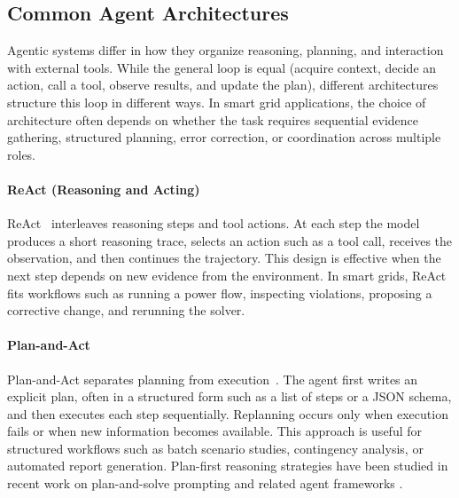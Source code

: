 \documentclass[journal,onecolumn]{IEEEtran} %
\begin{document}
\subsection{Common Agent Architectures}
Agentic systems differ in how they organize reasoning, planning, and interaction with external tools. While the general loop is equal (acquire context, decide an action, call a tool, observe results, and update the plan), different architectures structure this loop in different ways. In smart grid applications, the choice of architecture often depends on whether the task requires sequential evidence gathering, structured planning, error correction, or coordination across multiple roles.





\paragraph{ReAct (Reasoning and Acting)}
ReAct~\cite{yao2023react} interleaves reasoning steps and tool actions. At each step the model produces a short reasoning trace, selects an action such as a tool call, receives the observation, and then continues the trajectory. This design is effective when the next step depends on new evidence from the environment. In smart grids, ReAct fits workflows such as running a power flow, inspecting violations, proposing a corrective change, and rerunning the solver.

\paragraph{Plan-and-Act}
Plan-and-Act separates planning from execution~\cite{erdogan2025planact}. The agent first writes an explicit plan, often in a structured form such as a list of steps or a JSON schema, and then executes each step sequentially. Replanning occurs only when execution fails or when new information becomes available. This approach is useful for structured workflows such as batch scenario studies, contingency analysis, or automated report generation. Plan-first reasoning strategies have been studied in recent work on plan-and-solve prompting and related agent frameworks
\cite{wang2023plan}.
\end{document}
